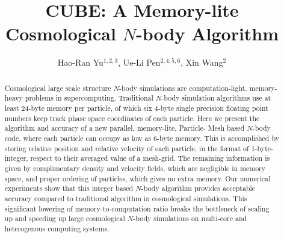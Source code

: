 \documentclass[10pt,twocolumn,preprint]{emulateapj}
\begin{document}
\title{CUBE: A Memory-lite Cosmological $N$-body Algorithm}
\author{
Hao-Ran Yu$^{1,2,3}$,
Ue-Li Pen$^{2,4,5,6}$,
Xin Wang$^{2}$
}


 
\begin{abstract}
Cosmological large scale structure $N$-body simulations are computation-light,
memory-heavy problems in supercomputing. Traditional $N$-body simulation
algorithms use at least 24-byte memory per particle, of which six 4-byte single 
precision floating point numbers keep track phase space coordinates of each particle.
Here we present the algorithm and accuracy of a new parallel, memory-lite, Particle-
Mesh based $N$-body code, where each particle can occupy as low as 6-byte memory. This 
is accomplished by storing relative position and relative velocity of each particle, 
in the format of 1-byte-integer, respect to their averaged value of a mesh-grid. The 
remaining information is given by complimentary density and velocity fields, which are 
negligible in memory space, and proper ordering of particles, which gives no extra 
memory. Our numerical experiments show that this integer based $N$-body algorithm 
provides acceptable accuracy compared to traditional algorithm in cosmological 
simulations. This significant lowering of memory-to-computation ratio breaks the 
bottleneck of scaling up and speeding up large cosmological $N$-body simulations on 
multi-core and heterogenous computing systems.

\end{abstract}

\keywords{}

\maketitle
\end{document}
